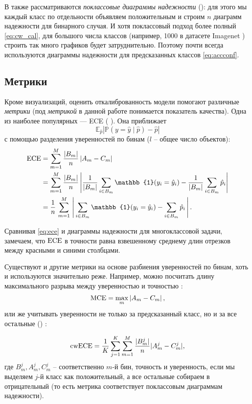 \documentclass[12pt]{article}
\begin{document}
В \cite{dirichlet} также рассматриваются \emph{поклассовые диаграммы надежности} (): для этого мы каждый класс по отдельности объявляем положительным и строим $n$ диаграмм надежности для бинарного случая. И хотя поклассовый подход более полный \eqref{eq:cw_cal}, для большого числа классов (например, 1000 в датасете Imagenet \cite{imagenet}) строить так много графиков будет затруднительно. Поэтому почти всегда используются диаграммы надежности для предсказанных классов \eqref{eq:accconf}.

\subsection{Метрики}
Кроме визуализаций, оценить откалиброванность модели помогают различные \emph{метрики} (под \emph{метрикой} в данной работе понимается показатель качества). Одна из наиболее популярных --- ECE ( \cite{bayesian_ece}). Она приближает
$$
\mathbb{E}_{\hat{p}}\left|
\mathbb{P}\left(y=\hat{y}\mid \hat{p}\right)-\hat{p}\right|
$$
с помощью разделения уверенностей по бинам ($l$ -- общее число объектов):
\begin{align}\label{eq:ece}
\ece &=
\sum_{m=1}^{M}
\frac{|B_m|}{n}
\left| A_m - C_m \right| \\
&=
\sum_{m=1}^{M}
\frac{|B_m|}{n}\left|
\frac{1}{|B_m|}\sum_{i\in B_m} \mathbb{1}(y_i=\hat{y}_i)
-
\frac{1}{|B_m|}\sum_{i\in B_m} \hat{p}_i
\right| \nonumber\\
&=
\frac{1}{n}\,\sum_{m=1}^{M}\,
\left|\,
\sum_{i\in B_m} \mathbb{1}(y_i=\hat{y}_i)
-
\sum_{i\in B_m} \hat{p}_i
\,\right|\nonumber.
\end{align}

Сравнивая \eqref{eq:ece} и диаграммы надежности для многоклассовой задачи, замечаем, что $\operatorname{ECE}$ в точности равна взвешенному среднему длин отрезков между красными и синими столбцами.

Существуют и другие метрики на основе разбиения уверенностей по бинам, хоть и используются значительно реже. Например, можно посчитать длину максимального разрыва между уверенностью и точностью \cite{bayesian_ece}:
\begin{equation}
    \operatorname{MCE}=\max_m \left|A_m - C_m\right|,
\end{equation}
или же учитывать уверенности не только за предсказанный класс, но и за все остальные () \cite{dirichlet}:

\begin{equation}\label{eq:cwece}
    \operatorname{cwECE}=\frac{1}{K}
\sum_{j=1}^K \sum_{m=1}^M
\frac{|B^j_m|}{n}|A^j_m - C^j_m|,
\end{equation}
где $B^j_m, A^j_m, C^j_m$ -- соответственно $m$-й бин, точность и уверенность, если мы выделяем $j$-й класс как положительный, а все остальные собираем в отрицательный (то есть метрика соответствует поклассовым диаграммам надежности).
\end{document}
